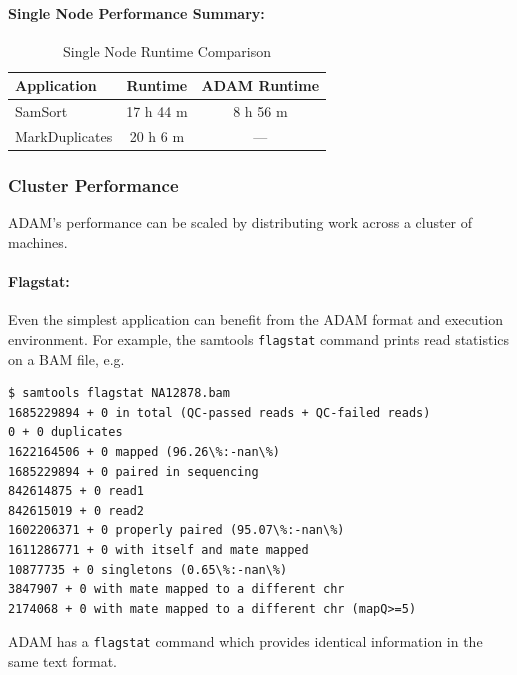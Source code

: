 \documentclass[10pt,twocolumn]{article}
\theoremstyle{plain}
\begin{document}
\paragraph{Single Node Performance Summary:}
\label{sec:single-node-summary}

\begin{table}[h]
\caption{Single Node Runtime Comparison}
\label{tab:single-node-performance}
\begin{center}
\begin{tabular}{| l | c | c |}
\hline
\bf Application & \bf Runtime & \bf ADAM Runtime \\
\hline
SamSort & 17 h 44 m & 8 h 56 m \\
MarkDuplicates & 20 h 6 m & --- \\  
\hline
\end{tabular}
\end{center}
\end{table}

\subsubsection{Cluster Performance}

ADAM's performance can be scaled by distributing work across a cluster of machines.

\paragraph{Flagstat:}
\label{sec:flagstat}

Even the simplest application can benefit from the ADAM format and execution
environment. For example, the samtools \texttt{flagstat} command prints
read statistics on a BAM file, e.g.

\begin{scriptsize}
\begin{verbatim}
$ samtools flagstat NA12878.bam
1685229894 + 0 in total (QC-passed reads + QC-failed reads)
0 + 0 duplicates
1622164506 + 0 mapped (96.26\%:-nan\%)
1685229894 + 0 paired in sequencing
842614875 + 0 read1
842615019 + 0 read2
1602206371 + 0 properly paired (95.07\%:-nan\%)
1611286771 + 0 with itself and mate mapped
10877735 + 0 singletons (0.65\%:-nan\%)
3847907 + 0 with mate mapped to a different chr
2174068 + 0 with mate mapped to a different chr (mapQ>=5)
\end{verbatim}
\end{scriptsize}

ADAM has a \texttt{flagstat} command which provides 
identical information in the same text format.
\end{document}
